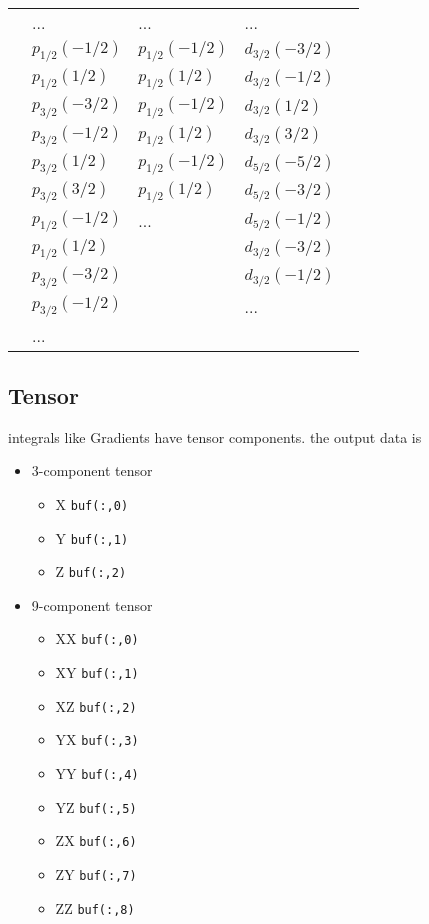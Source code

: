 \documentclass{article}
\begin{document}
\begin{itemize}
\begin{tabular}{l|l|l|l|l}
\hline
        & ...             & ...             & ...             &     \\
        & $p_{1/2}(-1/2)$ & $p_{1/2}(-1/2)$ & $d_{3/2}(-3/2)$ &     \\
        & $p_{1/2}( 1/2)$ & $p_{1/2}( 1/2)$ & $d_{3/2}(-1/2)$ &     \\
        & $p_{3/2}(-3/2)$ & $p_{1/2}(-1/2)$ & $d_{3/2}( 1/2)$ &     \\
        & $p_{3/2}(-1/2)$ & $p_{1/2}( 1/2)$ & $d_{3/2}( 3/2)$ &     \\
        & $p_{3/2}( 1/2)$ & $p_{1/2}(-1/2)$ & $d_{5/2}(-5/2)$ &     \\
        & $p_{3/2}( 3/2)$ & $p_{1/2}( 1/2)$ & $d_{5/2}(-3/2)$ &     \\
        & $p_{1/2}(-1/2)$ & ...             & $d_{5/2}(-1/2)$ &     \\
        & $p_{1/2}( 1/2)$ &                 & $d_{3/2}(-3/2)$ &     \\
        & $p_{3/2}(-3/2)$ &                 & $d_{3/2}(-1/2)$ &     \\
        & $p_{3/2}(-1/2)$ &                 & ...             &     \\
        & ...             &                 &                 &     \\
\hline
\end{tabular}
\end{itemize}
\subsection{Tensor}

integrals like Gradients have tensor components. the output data
is

\begin{itemize}
\item
  3-component tensor
  \begin{itemize}
  \item
    X \verb!buf(:,0)!
  \item
    Y \verb!buf(:,1)!
  \item
    Z \verb!buf(:,2)!
  \end{itemize}
\item
  9-component tensor
  \begin{itemize}
  \item
    XX \verb!buf(:,0)!
  \item
    XY \verb!buf(:,1)!
  \item
    XZ \verb!buf(:,2)!
  \item
    YX \verb!buf(:,3)!
  \item
    YY \verb!buf(:,4)!
  \item
    YZ \verb!buf(:,5)!
  \item
    ZX \verb!buf(:,6)!
  \item
    ZY \verb!buf(:,7)!
  \item
    ZZ \verb!buf(:,8)!
  \end{itemize}
\end{itemize}
\end{document}
